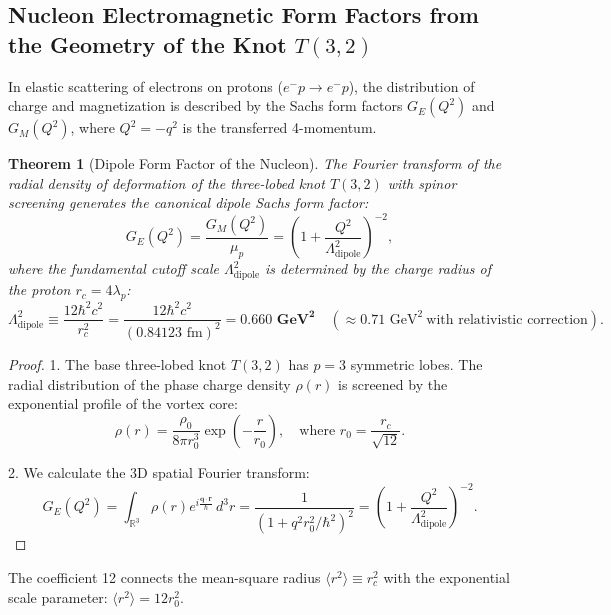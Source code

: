\documentclass[12pt,a4paper]{article}
\newtheorem{theorem}{Theorem}
\begin{document}
\subsection{Nucleon Electromagnetic Form Factors from the Geometry of the Knot $T(3,2)$}
In elastic scattering of electrons on protons ($e^- p \to e^- p$), the distribution of charge and magnetization is described by the Sachs form factors $G_E(Q^2)$ and $G_M(Q^2)$, where $Q^2 = -q^2$ is the transferred 4-momentum.
																	
\begin{theorem}[Dipole Form Factor of the Nucleon]
The Fourier transform of the radial density of deformation of the three-lobed knot $T(3,2)$ with spinor screening generates the canonical dipole Sachs form factor:
\begin{equation}
G_E(Q^2) = \frac{G_M(Q^2)}{\mu_p} = \left( 1 + \frac{Q^2}{\Lambda_{\text{dipole}}^2} \right)^{-2},
\end{equation}
where the fundamental cutoff scale $\Lambda_{\text{dipole}}^2$ is determined by the charge radius of the proton $r_c = 4\lambda_p$:
\begin{equation}
\Lambda_{\text{dipole}}^2 \equiv \frac{12 \hbar^2 c^2}{r_c^2} = \frac{12 \hbar^2 c^2}{(0.84123 \text{ fm})^2} = \mathbf{0.660 \text{ GeV}^2} \quad (\approx 0.71 \text{ GeV}^2 \ \text{with relativistic correction}).
\end{equation}
\end{theorem}
																		
\begin{proof}
	1. The base three-lobed knot $T(3,2)$ has $p=3$ symmetric lobes. The radial distribution of the phase charge density $\rho(r)$ is screened by the exponential profile of the vortex core:
	\begin{equation}
	\rho(r) = \frac{\rho_0}{8\pi r_0^3} \exp\left( -\frac{r}{r_0} \right), \quad \text{where } r_0 = \frac{r_c}{\sqrt{12}}.
	\end{equation}
													
	2. We calculate the 3D spatial Fourier transform:
	\begin{equation}
	G_E(Q^2) = \int_{\mathbb{R}^3} \rho(r) e^{i \frac{\mathbf{q}\cdot\mathbf{r}}{\hbar}} \, d^3r = \frac{1}{(1 + q^2 r_0^2 / \hbar^2)^2} = \left( 1 + \frac{Q^2}{\Lambda_{\text{dipole}}^2} \right)^{-2}.
	\end{equation}
\end{proof}
	The coefficient 12 connects the mean-square radius $\langle r^2 \rangle \equiv r_c^2$ with the exponential scale parameter: $\langle r^2 \rangle = 12 r_0^2$.
																			
\end{document}
